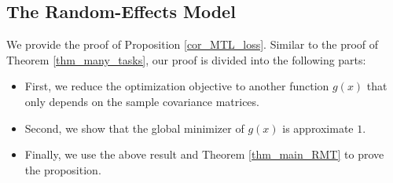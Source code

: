 \subsection{The Random-Effects Model}\label{app_iso_cov}

We provide the proof of Proposition \ref{cor_MTL_loss}. Similar to the proof of Theorem \ref{thm_many_tasks}, our proof is divided into the following parts:
\begin{itemize}
\item First, we reduce the optimization objective to another function $g(x)$ that only depends on the sample covariance matrices.
\item Second, we show that the global minimizer of $g(x)$ is approximate $1$.
\item Finally, we use the above result and Theorem \ref{thm_main_RMT} to prove the proposition.
\end{itemize}


